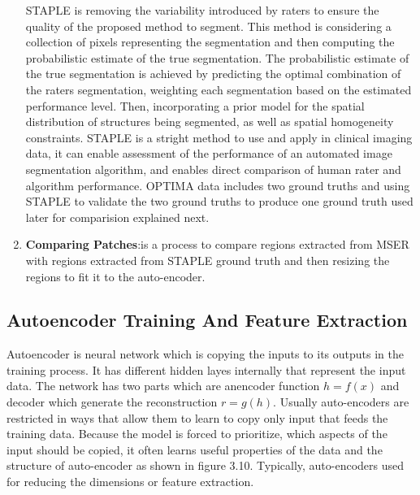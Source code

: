\begin{enumerate}
STAPLE is removing the variability introduced by raters to ensure the quality of the proposed method to segment.
This method is considering a collection of pixels representing the segmentation and then computing the probabilistic estimate of the true segmentation.
The probabilistic estimate of the true segmentation is achieved by predicting the optimal combination of the raters segmentation, weighting each segmentation based on the estimated performance level.
Then, incorporating a prior model for the spatial distribution of structures being segmented, as well as spatial homogeneity constraints.
STAPLE is a stright method to use and apply in clinical imaging data, it can enable assessment of the performance of an automated image segmentation algorithm, and enables direct comparison of human rater and algorithm performance\cite{warfield2004simultaneous}.
OPTIMA data includes two ground truths and using STAPLE to validate the two ground truths to produce one ground truth used later for comparision explained next.
\item\textbf{Comparing Patches}:is a process to compare regions extracted from MSER with regions extracted from STAPLE ground truth and then resizing the regions to fit it to the auto-encoder.
\end{enumerate}

\subsection{Autoencoder Training And Feature Extraction}
Autoencoder is neural network which is copying the inputs to its outputs in the training process.
It has different hidden layes internally that represent the input data.
The network has two parts which are anencoder function $h=f(x)$ and decoder which generate the reconstruction $r=g(h)$.
Usually auto-encoders are restricted in ways that allow them to learn to copy only input that feeds the training data.
Because the model is forced to prioritize, which aspects of the input should be copied, it often learns useful properties of the data and the structure of auto-encoder as shown in figure 3.10.
Typically, auto-encoders used for reducing the dimensions or feature extraction.

